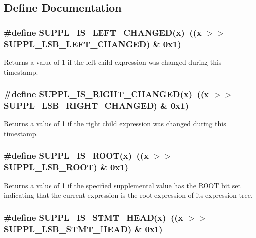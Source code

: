 \subsection{Define Documentation}
\subsubsection{\setlength{\rightskip}{0pt plus 5cm}\#define SUPPL\_\-IS\_\-LEFT\_\-CHANGED(x)\ ((x $>$$>$ SUPPL\_\-LSB\_\-LEFT\_\-CHANGED) \& 0x1)}\label{group__expr__suppl_a17}


Returns a value of 1 if the left child expression was changed during this timestamp. 
\subsubsection{\setlength{\rightskip}{0pt plus 5cm}\#define SUPPL\_\-IS\_\-RIGHT\_\-CHANGED(x)\ ((x $>$$>$ SUPPL\_\-LSB\_\-RIGHT\_\-CHANGED) \& 0x1)}\label{group__expr__suppl_a18}


Returns a value of 1 if the right child expression was changed during this timestamp. 
\subsubsection{\setlength{\rightskip}{0pt plus 5cm}\#define SUPPL\_\-IS\_\-ROOT(x)\ ((x $>$$>$ SUPPL\_\-LSB\_\-ROOT) \& 0x1)}\label{group__expr__suppl_a11}


Returns a value of 1 if the specified supplemental value has the ROOT bit set indicating that the current expression is the root expression of its expression tree. 
\subsubsection{\setlength{\rightskip}{0pt plus 5cm}\#define SUPPL\_\-IS\_\-STMT\_\-HEAD(x)\ ((x $>$$>$ SUPPL\_\-LSB\_\-STMT\_\-HEAD) \& 0x1)}\label{group__expr__suppl_a13}


